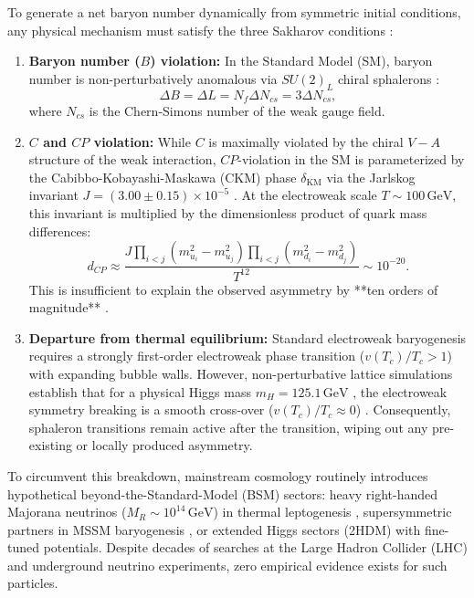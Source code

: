 \documentclass[11pt,a4paper]{article}
\begin{document}
To generate a net baryon number dynamically from symmetric initial conditions, any physical mechanism must satisfy the three Sakharov conditions \cite{Sakharov1967}:
\begin{enumerate}
    \item \textbf{Baryon number ($B$) violation:} In the Standard Model (SM), baryon number is non-perturbatively anomalous via $SU(2)_L$ chiral sphalerons \cite{Kuzmin1985}:
    \begin{equation}
    \Delta B = \Delta L = N_f \Delta N_{cs} = 3 \Delta N_{cs},
    \end{equation}
    where $N_{cs}$ is the Chern-Simons number of the weak gauge field.
    
    \item \textbf{$C$ and $CP$ violation:} While $C$ is maximally violated by the chiral $V-A$ structure of the weak interaction, $CP$-violation in the SM is parameterized by the Cabibbo-Kobayashi-Maskawa (CKM) phase $\delta_{\mathrm{KM}}$ via the Jarlskog invariant $J = (3.00 \pm 0.15) \times 10^{-5}$ \cite{Jarlskog1985}. At the electroweak scale $T \sim 100\,\mathrm{GeV}$, this invariant is multiplied by the dimensionless product of quark mass differences:
    \begin{equation}
    d_{CP} \approx \frac{J \prod_{i < j} (m_{u_i}^2 - m_{u_j}^2) \prod_{i < j} (m_{d_i}^2 - m_{d_j}^2)}{T^{12}} \sim 10^{-20}.
    \end{equation}
    This is insufficient to explain the observed asymmetry by **ten orders of magnitude** \cite{Gavela1994}.
    
    \item \textbf{Departure from thermal equilibrium:} Standard electroweak baryogenesis requires a strongly first-order electroweak phase transition ($v(T_c)/T_c > 1$) with expanding bubble walls. However, non-perturbative lattice simulations establish that for a physical Higgs mass $m_H = 125.1\,\mathrm{GeV}$ \cite{Aad2012}, the electroweak symmetry breaking is a smooth cross-over ($v(T_c)/T_c \approx 0$) \cite{Kajantie1996,Rummukainen1998}. Consequently, sphaleron transitions remain active after the transition, wiping out any pre-existing or locally produced asymmetry.
\end{enumerate}

To circumvent this breakdown, mainstream cosmology routinely introduces hypothetical beyond-the-Standard-Model (BSM) sectors: heavy right-handed Majorana neutrinos ($M_R \sim 10^{14}\,\mathrm{GeV}$) in thermal leptogenesis \cite{Fukugita1986,Buchmuller2005}, supersymmetric partners in MSSM baryogenesis \cite{Carena1996}, or extended Higgs sectors (2HDM) with fine-tuned potentials. Despite decades of searches at the Large Hadron Collider (LHC) and underground neutrino experiments, zero empirical evidence exists for such particles.
\end{document}
